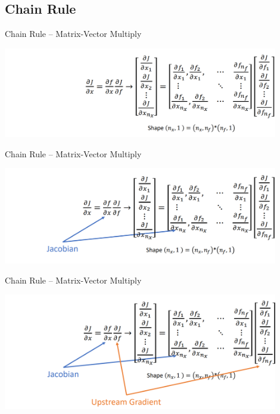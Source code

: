 \documentclass[serif, aspectratio=169]{beamer}
\begin{document}
\subsection{Chain Rule}
\begin{frame}{Chain Rule – Matrix-Vector Multiply}
    \begin{center}
        \includegraphics[width=12cm]{pic/chain1.png}  
    \end{center}
\end{frame}

\begin{frame}{Chain Rule – Matrix-Vector Multiply}
    \begin{center}
        \includegraphics[width=12cm]{pic/chain2.png}  
    \end{center}
\end{frame}

\begin{frame}{Chain Rule – Matrix-Vector Multiply}
    \begin{center}
        \includegraphics[width=12cm]{pic/chain3.png}  
    \end{center}
\end{frame}
\end{document}

